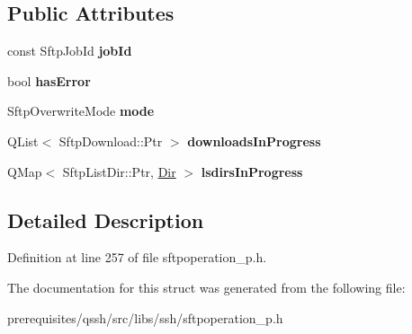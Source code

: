 \subsection*{Public Attributes}
\begin{DoxyCompactItemize}
\item 
\mbox{\label{struct_q_ssh_1_1_internal_1_1_sftp_download_dir_adff41ac7998c752bae32cdf09ffcef66}} 
const Sftp\+Job\+Id {\bfseries job\+Id}
\item 
\mbox{\label{struct_q_ssh_1_1_internal_1_1_sftp_download_dir_a02327f472eec2ed3ecd7d4b6b160167d}} 
bool {\bfseries has\+Error}
\item 
\mbox{\label{struct_q_ssh_1_1_internal_1_1_sftp_download_dir_ab0e5d832b4bdbed4de921df517419988}} 
Sftp\+Overwrite\+Mode {\bfseries mode}
\item 
\mbox{\label{struct_q_ssh_1_1_internal_1_1_sftp_download_dir_a90474d10c922b8fc628827f2f86aa3c6}} 
Q\+List$<$ Sftp\+Download\+::\+Ptr $>$ {\bfseries downloads\+In\+Progress}
\item 
\mbox{\label{struct_q_ssh_1_1_internal_1_1_sftp_download_dir_ab9f5b8820ed600aaf37dd3a54110afe6}} 
Q\+Map$<$ Sftp\+List\+Dir\+::\+Ptr, \mbox{\hyperlink{struct_q_ssh_1_1_internal_1_1_sftp_download_dir_1_1_dir}{Dir}} $>$ {\bfseries lsdirs\+In\+Progress}
\end{DoxyCompactItemize}


\subsection{Detailed Description}


Definition at line 257 of file sftpoperation\+\_\+p.\+h.



The documentation for this struct was generated from the following file\+:\begin{DoxyCompactItemize}
\item 
prerequisites/qssh/src/libs/ssh/sftpoperation\+\_\+p.\+h\end{DoxyCompactItemize}
